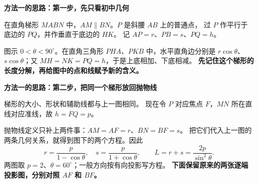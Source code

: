 \begin{proofbox}
\textbf{\textcolor{CProof}{方法一的思路：第一步，先只看初中几何}}

在直角梯形 $MABN$ 中，$AM\parallel BN$。$P$ 是斜腰 $AB$ 上的普通点，
过 $P$ 作平行于底边的 $PQ$，并作垂直于底边的 $HK$。
记 $AP=r$、$PB=s$、$PQ=h$。
\begin{center}\end{center}
图示 $0<\theta<90^\circ$。在直角三角形 $PHA$、$PKB$ 中，水平直角边分别是
$r\cos\theta$、$s\cos\theta$；又 $MH=NK=PQ=h$，于是上底相加、下底相减。
\textbf{先记住这个梯形的长度分解，再给图中的点和线赋予新的含义。}
\end{proofbox}
\clearpage
\begin{proofbox}
\textbf{\textcolor{CProof}{方法一的思路：第二步，把同一个梯形放回抛物线}}

梯形的大小、形状和辅助线都与上一图相同。
现在令 $P$ 对应焦点 $F$，$MN$ 所在直线对应准线，故 $h=FQ=p$。
\begin{center}\end{center}
抛物线定义只补上两件事：$AM=AF=r$、$BN=BF=s$。
把它们代入上一图的两条几何关系，就得到图下的两个方程。因此
\[
 r=\frac p{1-\cos\theta},\quad s=\frac p{1+\cos\theta},\qquad
 L=r+s=\frac{2p}{\sin^2\theta}.
\]
两图取 $p=2$、$\theta=60^\circ$；一般方向按有向投影写方程。
\textbf{下面保留原来的两张逐端投影图，分别对照 $AF$ 和 $BF$。}
\end{proofbox}
